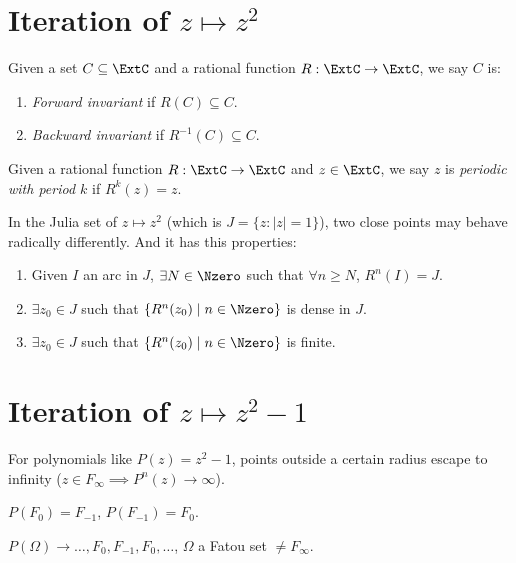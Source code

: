 \section{Iteration of $z \mapsto z^2$}

\begin{definition}
    Given a set $C \subseteq \ExtC$ and a rational function $R: \ExtC \to
    \ExtC$, we say $C$ is:
    \begin{enumerate}
        \item \emph{Forward invariant} if $R(C) \subseteq C$.
        \item \emph{Backward invariant} if $R^{-1}(C) \subseteq C$.
    \end{enumerate}
\end{definition}

\begin{definition}
    Given a rational function $R: \ExtC \to \ExtC$ and $z \in \ExtC$, we say $z$
    is \emph{periodic with period $k$} if $R^k(z) = z$.
\end{definition}

In the Julia set of $z \mapsto z^2$ (which is $J = \{z : |z| = 1\}$), two close
points may behave radically differently. And it has this properties:
\begin{enumerate}
    \item Given $I$ an arc in $J$, $\exists N \in \Nzero$ such that $\forall n
    \geq N$, $R^n(I) = J$.
    \item $\exists z_0 \in J$ such that $\{R^n(z_0) \mid n \in \Nzero\}$ is
    dense in $J$.
    \item $\exists z_0 \in J$ such that $\{R^n(z_0) \mid n \in \Nzero\}$ is
    finite.
\end{enumerate}

\section{Iteration of $z \mapsto z^2 - 1$}
For polynomials like $P(z) = z^2 - 1$, points outside a certain radius escape to
infinity ($z \in F_\infty \implies P^n(z) \to \infty$).

$P(F_0) = F_{-1}$, $P(F_{-1}) = F_0$.

$P(\Omega) \to \ldots, F_0, F_{-1}, F_0, \ldots$, $\Omega$ a Fatou set $\neq
F_\infty$.

